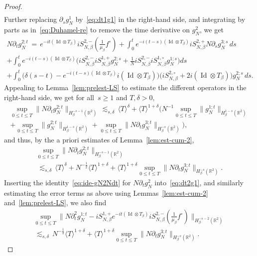 \documentclass[10pt,a4paper]{amsart}
\newcommand{\Id}{\operatorname{Id}}
\newcommand{\R}{\mathbb R}
\begin{document}
\begin{proof}
\begin{multline*}
\end{multline*}
Further replacing $\partial_sg_N^1$ by~\eqref{eq:dt1g1} in the right-hand side, and integrating by parts as in~\eqref{eq:Duhamel-re} to remove the time derivative on $g_N^2$, we get
\begin{multline}\label{eq:ide-gN2Ndt}
N\partial_tg_N^{2;t}\,=\,e^{-it(\Id\otimes T_\beta)}iS_{N,\beta}^{2,-}(\tfrac1{\mu_\beta}f^\circ)
+\int_0^te^{-i(t-s)(\Id\otimes T_\beta)}iS_{N,\beta}^{2,+}N\partial_sg_N^{3;s}\,ds\\
+\int_0^te^{-i(t-s)(\Id\otimes T_\beta)}\Big(iS_{N,\beta}^{2,-}iS_{N,\beta}^{1,+}g_N^{2;s}+\tfrac1NiS_{N,\beta}^{2,-}iS_{N,\beta}^{1,\circ}g_N^{1;s}\Big)ds\\
+\int_0^t\Big(\delta(s-t)- e^{-i(t-s)(\Id\otimes T_\beta)}i(\Id\otimes T_\beta)\Big)\big(iS_{N,\beta}^{2,\circ}+2i(\Id\otimes T_\beta)\big)g_N^{2;s}\,ds.
\end{multline}
{Appealing to Lemma~\ref{lem:prelest-LS} to estimate the different operators in the right-hand side, we get for all~$s\ge1$ and $T,\delta>0$,
\begin{multline*}
\sup_{0\le t\le T}\|N\partial_tg_N^{2;t}\|_{H_\beta^{-s-1}(\R^2)}\,\lesssim_{s,\delta}\,\langle T\rangle^\delta
+\langle T\rangle^{1+\delta}\Big(N^{-1}\sup_{0\le t\le T}\|g_N^{1;t}\|_{H_\beta^{1-s}(\R^2)}\\
+\sup_{0\le t\le T}\|g_N^{2;t}\|_{H_\beta^{1-s}(\R^2)}
+\sup_{0\le t\le T}\|N\partial_tg_N^{3;t}\|_{H_\beta^{-s}(\R^2)}\Big),
\end{multline*}
and thus, by the a priori estimates of Lemma~\ref{lem:est-cum-2},
\begin{multline}\label{eq:estim-dt2g1}
\sup_{0\le t\le T}\|N\partial_tg_N^{2;t}\|_{H_\beta^{-s-1}(\R^2)}\\[-3mm]
\,\lesssim_{s,\delta}\,\langle T\rangle^\delta
+N^{-\frac12}\langle T\rangle^{1+\delta}
+\langle T\rangle^{1+\delta}\sup_{0\le t\le T}\|N\partial_tg_N^{3;t}\|_{H_\beta^{-s}(\R^2)}.
\end{multline}
Inserting the identity~\eqref{eq:ide-gN2Ndt} for $N\partial_tg_N^2$ into~\eqref{eq:dt2g1}, and similarly estimating the error terms as above using Lemmas~\ref{lem:est-cum-2} and~\ref{lem:prelest-LS}, we also find}
\begin{multline}\label{eq:estim-dt2g1-main}
\sup_{0\le t\le T}\Big\|N\partial_t^2g_N^{1;t}-iS_{N,\beta}^{1,+}e^{-it(\Id\otimes T_\beta)}iS_{N,\beta}^{2,-}(\tfrac1{\mu_\beta}f^\circ)\Big\|_{H^{-s-2}_\beta(\R^2)}\\
\,\lesssim_{s,\delta}\,N^{-\frac12}\langle T\rangle^{1+\delta} +\langle T\rangle^{1+\delta}\sup_{0\le t\le T}\|N\partial_tg_N^{3;t}\|_{H^{-s}_\beta(\R^2)}.

\end{multline}
\end{proof}
\end{document}
